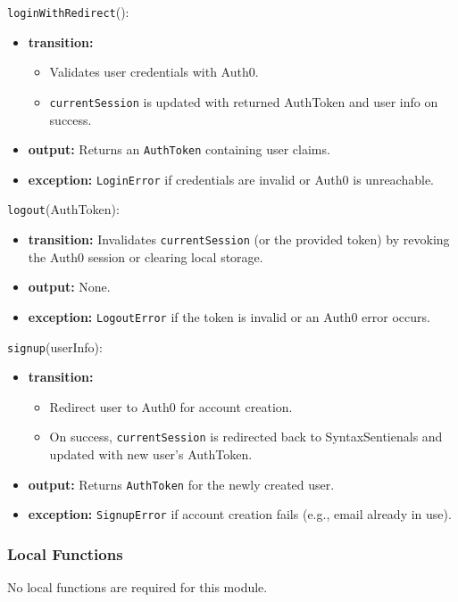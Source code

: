 \documentclass[12pt, titlepage]{article}
\begin{document}
\noindent \texttt{loginWithRedirect}():
\begin{itemize}
    \item \textbf{transition:}
    \begin{itemize}
        \item Validates user credentials with Auth0.
        \item \texttt{currentSession} is updated with returned AuthToken and user info on success.
    \end{itemize}
    \item \textbf{output:} Returns an \texttt{AuthToken} containing user claims.
    \item \textbf{exception:} \texttt{LoginError} if credentials are invalid or Auth0 is unreachable.
\end{itemize}

\noindent \texttt{logout}(AuthToken):
\begin{itemize}
    \item \textbf{transition:} Invalidates \texttt{currentSession} (or the provided token) by revoking the Auth0 session or clearing local storage.
    \item \textbf{output:} None.
    \item \textbf{exception:} \texttt{LogoutError} if the token is invalid or an Auth0 error occurs.
\end{itemize}

\noindent \texttt{signup}(userInfo):
\begin{itemize}
    \item \textbf{transition:}
    \begin{itemize}
        \item Redirect user to Auth0 for account creation.
        \item On success, \texttt{currentSession} is redirected back to SyntaxSentienals and updated with new user’s AuthToken.
    \end{itemize}
    \item \textbf{output:} Returns \texttt{AuthToken} for the newly created user.
    \item \textbf{exception:} \texttt{SignupError} if account creation fails (e.g., email already in use).
\end{itemize}

\subsubsection{Local Functions}
No local functions are required for this module.
\end{document}
